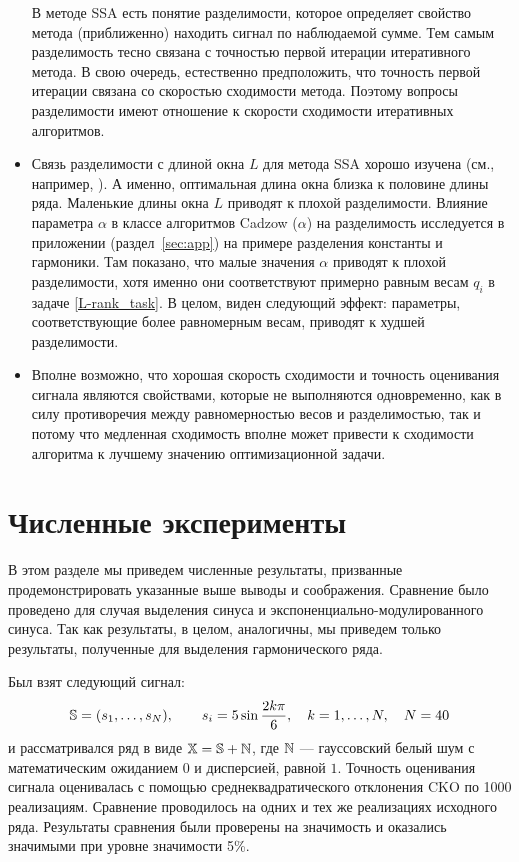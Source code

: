 \documentclass[12pt,a4paper,fleqn,leqno]{article}
\begin{document}
\begin{itemize}
В методе SSA есть понятие разделимости, которое определяет свойство метода (приближенно) находить сигнал по наблюдаемой сумме. Тем самым разделимость
тесно связана с точностью первой итерации итеративного метода. В свою очередь, естественно предположить, что точность первой итерации связана со скоростью сходимости метода. Поэтому вопросы разделимости имеют отношение к скорости сходимости итеративных алгоритмов. 
\item
Связь разделимости с длиной окна $L$ для метода SSA хорошо изучена (см., например, \cite{Golyandina2010}). А именно, оптимальная длина окна близка
к половине длины ряда. Маленькие длины окна $L$ приводят к плохой разделимости. Влияние параметра $\alpha$ в классе алгоритмов 
Cadzow ($\alpha$) на разделимость исследуется в приложении (раздел~\ref{sec:app}) на примере разделения константы и гармоники. Там показано, что малые значения
$\alpha$ приводят к плохой разделимости, хотя именно они соответствуют примерно равным весам $q_i$ в задаче \eqref{L-rank_task}.
В целом, виден следующий эффект: параметры, соответствующие более равномерным весам, приводят к худшей разделимости.
\item
Вполне возможно, что хорошая скорость сходимости и точность оценивания сигнала являются свойствами, которые не выполняются одновременно, как в силу 
противоречия между равномерностью весов и разделимостью, так и потому что медленная сходимость вполне может привести к сходимости алгоритма к лучшему значению оптимизационной задачи.
\end{itemize}

\section{Численные эксперименты}
\label{sec:simul}
В этом разделе мы приведем численные результаты, призванные продемонстрировать указанные выше выводы и соображения.
Сравнение было проведено для случая выделения синуса и экспоненциально-модулированного синуса.
Так как результаты, в целом, аналогичны, мы приведем только результаты, полученные для выделения гармонического ряда.

Был взят следующий сигнал:
\begin{equation*}
\mathbb{S} = (s_{1}, \ldots, s_N), \qquad s_{i} = 5\sin{\frac{2 k \pi}{6}}, \quad k = 1, \ldots, N, \quad N = 40
\end{equation*}
и рассматривался ряд в виде $\mathbb{X} = \mathbb{S} + \mathbb{N}$, где  $\mathbb{N}$ --- гауссовский белый шум с математическим ожиданием $0$ и дисперсией, равной $1$.
Точность оценивания сигнала оценивалась с помощью среднеквадратического отклонения CKO по 1000 реализациям.
Сравнение проводилось на одних и тех же реализациях исходного ряда. Результаты сравнения были проверены на значимость и оказались значимыми 
при уровне значимости 5\%. %
\end{document}
